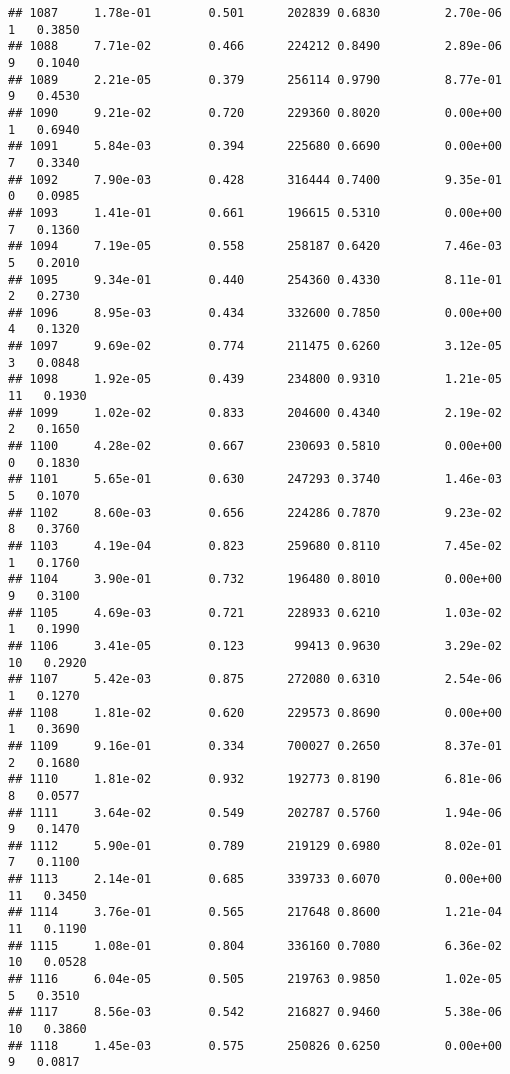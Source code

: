 \documentclass[
]{article}
\begin{document}
\begin{verbatim}
## 1087     1.78e-01        0.501      202839 0.6830         2.70e-06   1   0.3850
## 1088     7.71e-02        0.466      224212 0.8490         2.89e-06   9   0.1040
## 1089     2.21e-05        0.379      256114 0.9790         8.77e-01   9   0.4530
## 1090     9.21e-02        0.720      229360 0.8020         0.00e+00   1   0.6940
## 1091     5.84e-03        0.394      225680 0.6690         0.00e+00   7   0.3340
## 1092     7.90e-03        0.428      316444 0.7400         9.35e-01   0   0.0985
## 1093     1.41e-01        0.661      196615 0.5310         0.00e+00   7   0.1360
## 1094     7.19e-05        0.558      258187 0.6420         7.46e-03   5   0.2010
## 1095     9.34e-01        0.440      254360 0.4330         8.11e-01   2   0.2730
## 1096     8.95e-03        0.434      332600 0.7850         0.00e+00   4   0.1320
## 1097     9.69e-02        0.774      211475 0.6260         3.12e-05   3   0.0848
## 1098     1.92e-05        0.439      234800 0.9310         1.21e-05  11   0.1930
## 1099     1.02e-02        0.833      204600 0.4340         2.19e-02   2   0.1650
## 1100     4.28e-02        0.667      230693 0.5810         0.00e+00   0   0.1830
## 1101     5.65e-01        0.630      247293 0.3740         1.46e-03   5   0.1070
## 1102     8.60e-03        0.656      224286 0.7870         9.23e-02   8   0.3760
## 1103     4.19e-04        0.823      259680 0.8110         7.45e-02   1   0.1760
## 1104     3.90e-01        0.732      196480 0.8010         0.00e+00   9   0.3100
## 1105     4.69e-03        0.721      228933 0.6210         1.03e-02   1   0.1990
## 1106     3.41e-05        0.123       99413 0.9630         3.29e-02  10   0.2920
## 1107     5.42e-03        0.875      272080 0.6310         2.54e-06   1   0.1270
## 1108     1.81e-02        0.620      229573 0.8690         0.00e+00   1   0.3690
## 1109     9.16e-01        0.334      700027 0.2650         8.37e-01   2   0.1680
## 1110     1.81e-02        0.932      192773 0.8190         6.81e-06   8   0.0577
## 1111     3.64e-02        0.549      202787 0.5760         1.94e-06   9   0.1470
## 1112     5.90e-01        0.789      219129 0.6980         8.02e-01   7   0.1100
## 1113     2.14e-01        0.685      339733 0.6070         0.00e+00  11   0.3450
## 1114     3.76e-01        0.565      217648 0.8600         1.21e-04  11   0.1190
## 1115     1.08e-01        0.804      336160 0.7080         6.36e-02  10   0.0528
## 1116     6.04e-05        0.505      219763 0.9850         1.02e-05   5   0.3510
## 1117     8.56e-03        0.542      216827 0.9460         5.38e-06  10   0.3860
## 1118     1.45e-03        0.575      250826 0.6250         0.00e+00   9   0.0817

\end{verbatim}
\end{document}
